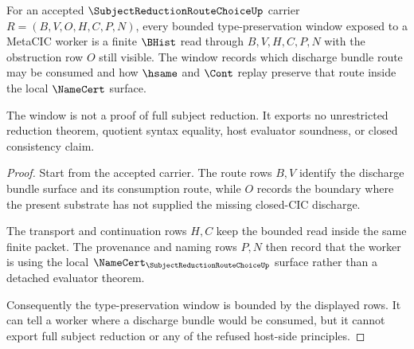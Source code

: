 \begin{theorem}
\label{thm:subject-reduction-route-choice-type-preservation-window}
For an accepted $\SubjectReductionRouteChoiceUp$ carrier $R=(B,V,O,H,C,P,N)$, every bounded type-preservation window exposed to a MetaCIC worker is a finite $\BHist$ read through $B,V,H,C,P,N$ with the obstruction row $O$ still visible. The window records which discharge bundle route may be consumed and how $\hsame$ and $\Cont$ replay preserve that route inside the local $\NameCert$ surface.

The window is not a proof of full subject reduction. It exports no unrestricted reduction theorem, quotient syntax equality, host evaluator soundness, or closed consistency claim.
\end{theorem}
\begin{proof}
Start from the accepted carrier. The route rows $B,V$ identify the discharge bundle surface and its consumption route, while $O$ records the boundary where the present substrate has not supplied the missing closed-CIC discharge.

The transport and continuation rows $H,C$ keep the bounded read inside the same finite packet. The provenance and naming rows $P,N$ then record that the worker is using the local $\NameCert_{\SubjectReductionRouteChoiceUp}$ surface rather than a detached evaluator theorem.

Consequently the type-preservation window is bounded by the displayed rows. It can tell a worker where a discharge bundle would be consumed, but it cannot export full subject reduction or any of the refused host-side principles.
\end{proof}

